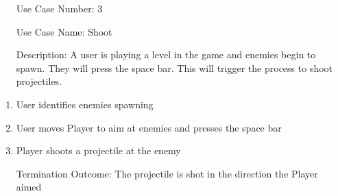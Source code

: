 \documentclass[10pt,conference,onecolumn,compsoc]{IEEEtran}
\begin{document}
\begin{itemize}
\item[Use Case Number:]3
\item[Use Case Name:] Shoot
\item[Description:] A user is playing a level in the game and enemies begin to spawn. They will press the space bar. This will trigger the process to shoot projectiles.
\end{itemize}
\begin{enumerate}
\item User identifies enemies spawning
\item User moves Player to aim at enemies and presses the space bar
\item Player shoots a projectile at the enemy
\item[Termination Outcome:] The projectile is shot in the direction the Player aimed
\end{enumerate}
\end{document}
